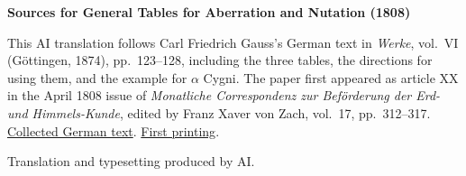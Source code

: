 \clearpage\thispagestyle{empty}
\begin{center}\textbf{Sources for General Tables for Aberration and Nutation (1808)}\end{center}
\noindent This AI translation follows Carl Friedrich Gauss’s German text in \textit{Werke}, vol.~VI (Göttingen, 1874), pp.~123--128, including the three tables, the directions for using them, and the example for $\alpha$ Cygni. The paper first appeared as article XX in the April 1808 issue of \textit{Monatliche Correspondenz zur Beförderung der Erd- und Himmels-Kunde}, edited by Franz Xaver von Zach, vol.~17, pp.~312--317. \href{https://gdz.sub.uni-goettingen.de/id/PPN236007467}{Collected German text}. \href{https://www.digitale-sammlungen.de/en/view/bsb10538608?page=318}{First printing}.
\par\smallskip\noindent Translation and typesetting produced by AI.
\clearpage
